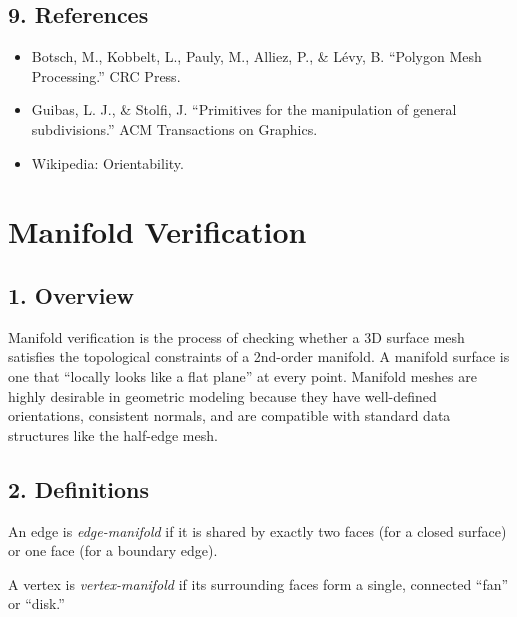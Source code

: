 \subsection{9. References}

\begin{itemize}
    \item Botsch, M., Kobbelt, L., Pauly, M., Alliez, P., \& L\'evy, B. \cite{botsch2010} ``Polygon Mesh Processing.'' CRC Press.
    \item Guibas, L. J., \& Stolfi, J. \cite{guibas1985} ``Primitives for the manipulation of general subdivisions.'' ACM Transactions on Graphics.
    \item Wikipedia: Orientability.
\end{itemize}

\section{Manifold Verification}
\label{sec:manifold_verification}

\subsection{1. Overview}

Manifold verification is the process of checking whether a 3D surface mesh satisfies the topological constraints of a 2nd-order manifold. A manifold surface is one that ``locally looks like a flat plane'' at every point. Manifold meshes are highly desirable in geometric modeling because they have well-defined orientations, consistent normals, and are compatible with standard data structures like the half-edge mesh\cite{guibas1985}.

\subsection{2. Definitions}

\begin{definition}\label{def:edge_manifold}
An edge is \emph{edge-manifold} if it is shared by exactly two faces (for a closed surface) or one face (for a boundary edge).
\end{definition}

\begin{definition}\label{def:vertex_manifold}
A vertex is \emph{vertex-manifold} if its surrounding faces form a single, connected ``fan'' or ``disk.''
\end{definition}

